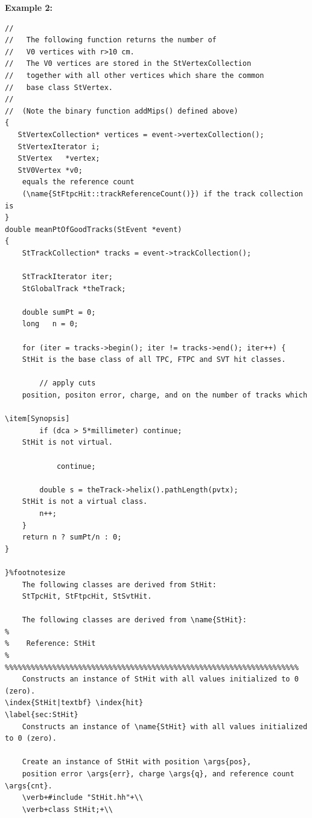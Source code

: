 {\bf Example 2:}    
{\footnotesize
\begin{verbatim}
//
//   The following function returns the number of
//   V0 vertices with r>10 cm.
//   The V0 vertices are stored in the StVertexCollection
//   together with all other vertices which share the common
//   base class StVertex.
//
//  (Note the binary function addMips() defined above) 
{
   StVertexCollection* vertices = event->vertexCollection();
   StVertexIterator i;
   StVertex   *vertex;
   StV0Vertex *v0;
    equals the reference count
    (\name{StFtpcHit::trackReferenceCount()}) if the track collection is
}  
double meanPtOfGoodTracks(StEvent *event)
{
    StTrackCollection* tracks = event->trackCollection();

    StTrackIterator iter;
    StGlobalTrack *theTrack;

    double sumPt = 0;
    long   n = 0;

    for (iter = tracks->begin(); iter != tracks->end(); iter++) {
    StHit is the base class of all TPC, FTPC and SVT hit classes.

        // apply cuts
    position, positon error, charge, and on the number of tracks which
    
\item[Synopsis] 
        if (dca > 5*millimeter) continue;
    StHit is not virtual.
    
            continue;

        double s = theTrack->helix().pathLength(pvtx);
    StHit is not a virtual class.
        n++;
    }
    return n ? sumPt/n : 0;
}
    
}%footnotesize
    The following classes are derived from StHit: 
    StTpcHit, StFtpcHit, StSvtHit.

    The following classes are derived from \name{StHit}: 
%
%    Reference: StHit
%
%%%%%%%%%%%%%%%%%%%%%%%%%%%%%%%%%%%%%%%%%%%%%%%%%%%%%%%%%%%%%%%%%%%%
    Constructs an instance of StHit with all values initialized to 0 (zero).
\index{StHit|textbf} \index{hit}
\label{sec:StHit}
    Constructs an instance of \name{StHit} with all values initialized to 0 (zero).
    
    Create an instance of StHit with position \args{pos},
    position error \args{err}, charge \args{q}, and reference count \args{cnt}.
    \verb+#include "StHit.hh"+\\
    \verb+class StHit;+\\


\end{verbatim}}
